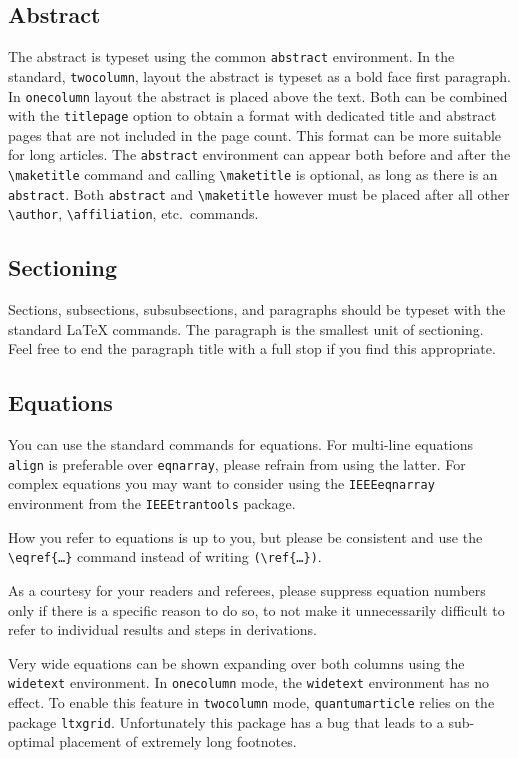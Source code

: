 \documentclass[a4paper,noarxiv,onecolumn]{quantumarticle}
\begin{document}
	\subsection{Abstract}
	The abstract is typeset using the common \texttt{abstract} environment. In the standard, \texttt{twocolumn}, layout the abstract is typeset as a bold face first paragraph.
	In \texttt{onecolumn} layout the abstract is placed above the text.
	Both can be combined with the \texttt{titlepage} option to obtain a format with dedicated title and abstract pages that are not included in the page count.
	This format can be more suitable for long articles.
	The \texttt{abstract} environment can appear both before and after the \texttt{\textbackslash{}maketitle} command and calling \texttt{\textbackslash{}maketitle} is optional, as long as there is an \texttt{abstract}.
	Both \texttt{abstract} and \texttt{\textbackslash{}maketitle} however must be placed after all other \texttt{\textbackslash{}author}, \texttt{\textbackslash{}affiliation}, etc.\ commands.

	\subsection{Sectioning}
	Sections, subsections, subsubsections, and paragraphs should be typeset with the standard LaTeX commands. The paragraph is the smallest unit of sectioning. Feel free to end the paragraph title with a full stop if you find this appropriate.

	\subsection{Equations}
	You can use the standard commands for equations. For multi-line equations \texttt{align} is preferable over \texttt{eqnarray}, please refrain from using the latter.	For complex equations you may want to consider using the \texttt{IEEEeqnarray} environment from the \texttt{IEEEtrantools} package.

	How you refer to equations is up to you, but please be consistent and use the \texttt{\textbackslash{}eqref\{\dots\}} command instead of writing \texttt{(\textbackslash{}ref\{\dots\})}.

	As a courtesy for your readers and referees, please suppress equation numbers only if there is a specific reason to do so, to not make it unnecessarily difficult to refer to individual results and steps in derivations.

	Very wide equations can be shown expanding over both columns using the \texttt{widetext} environment.
	In \texttt{onecolumn} mode, the \texttt{widetext} environment has no effect.
	To enable this feature in \texttt{twocolumn} mode, \texttt{quantumarticle} relies on the package \texttt{ltxgrid}.
	Unfortunately this package has a bug that leads to a sub-optimal placement of extremely long footnotes.
\end{document}
